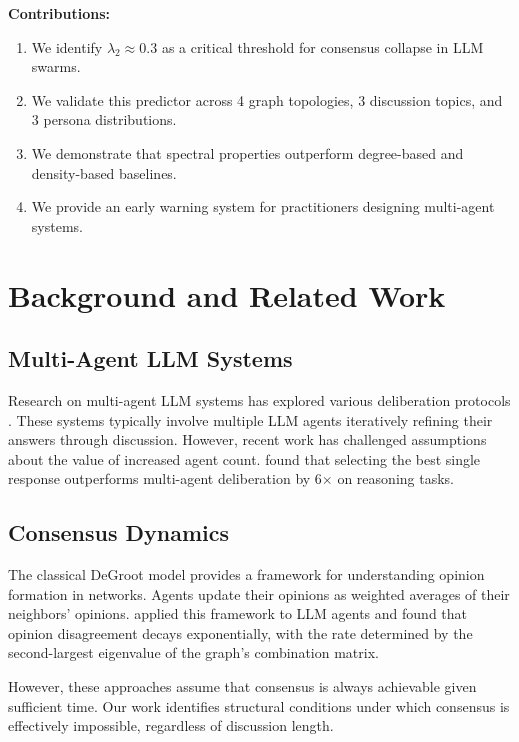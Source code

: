 \documentclass[10pt]{article}
\begin{document}
\textbf{Contributions:}
\begin{enumerate}
    \item We identify \(\lambda_2 \approx 0.3\) as a critical threshold for consensus collapse in LLM swarms.
    \item We validate this predictor across 4 graph topologies, 3 discussion topics, and 3 persona distributions.
    \item We demonstrate that spectral properties outperform degree-based and density-based baselines.
    \item We provide an early warning system for practitioners designing multi-agent systems.
\end{enumerate}

\section{Background and Related Work}

\subsection{Multi-Agent LLM Systems}

Research on multi-agent LLM systems has explored various deliberation protocols \citep{du2023improving, liang2023encouraging, chan2024chateval}. These systems typically involve multiple LLM agents iteratively refining their answers through discussion. However, recent work has challenged assumptions about the value of increased agent count. \citet{kaushal2026deliberationbench} found that selecting the best single response outperforms multi-agent deliberation by 6\(\times\) on reasoning tasks.

\subsection{Consensus Dynamics}

The classical DeGroot model \citep{degroot1974reaching} provides a framework for understanding opinion formation in networks. Agents update their opinions as weighted averages of their neighbors' opinions. \citet{yazici2026consensus} applied this framework to LLM agents and found that opinion disagreement decays exponentially, with the rate determined by the second-largest eigenvalue of the graph's combination matrix.

However, these approaches assume that consensus is always achievable given sufficient time. Our work identifies structural conditions under which consensus is effectively impossible, regardless of discussion length.
\end{document}
